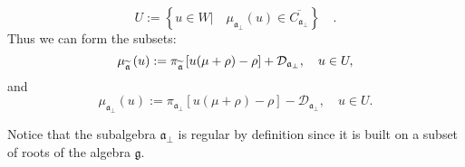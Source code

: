 \documentclass[preprint,12pt]{elsarticle}
\newcommand{\af}{\mathfrak{a}}
\newcommand{\afb}{\mathfrak{a}_{\bot}}
\begin{document}
\begin{equation}
U:=\left\{ u\in W|\quad \mu _{\afb}\left( u\right) \in
\overline{C_{\afb}}\right\} \quad .  \label{U-def}
\end{equation}
Thus we can form the subsets:
\begin{equation}
\mu _{\widetilde{\mathfrak{a}}}\left( u\right) :=\pi _{\widetilde{%
\mathfrak{a}}}\left[ u(\mu +\rho )-\rho \right] +\mathcal{D}_{\af%
_{\perp }},\quad u\in U,  \label{mu-a}
\end{equation}
and
\begin{equation}
\mu _{\afb}\left( u\right) :=\pi _{\afb}\left[
u(\mu +\rho )-\rho \right] -\mathcal{D}_{\afb},\quad u\in U.
\label{mu-a-tilda}
\end{equation}

Notice that the subalgebra $\mathfrak{a}_{\bot}$ is regular by definition
since it is built on a subset of roots of the algebra $\mathfrak{g}$.
\end{document}
